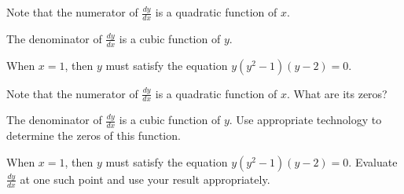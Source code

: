 \begin{smallhint}
\ba
	\item Note that the numerator of $\frac{dy}{dx}$ is a quadratic function of $x$.
	\item The denominator of $\frac{dy}{dx}$ is a cubic function of $y$.
	\item When $x = 1$, then $y$ must satisfy the equation $y(y^2-1)(y-2) = 0$.
\ea
\end{smallhint}
\begin{bighint}
\ba
	\item Note that the numerator of $\frac{dy}{dx}$ is a quadratic function of $x$.  What are its zeros?
	\item The denominator of $\frac{dy}{dx}$ is a cubic function of $y$.  Use appropriate technology to determine the zeros of this function.
	\item When $x = 1$, then $y$ must satisfy the equation $y(y^2-1)(y-2) = 0$.  Evaluate $\frac{dy}{dx}$ at one such point and use your result appropriately.
\ea
\end{bighint}
